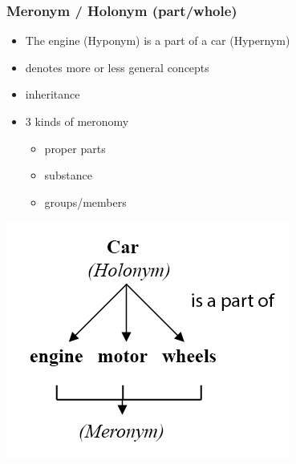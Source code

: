 \begin{frame}
\frametitle{Meronym / Holonym (part/whole)}
\begin{minipage}{0.5\textwidth}
\begin{itemize}
\item The engine (Hyponym) is a part of a car (Hypernym)
\item denotes more or less general concepts
\item inheritance
\item 3 kinds of meronomy
\begin{itemize}
\item proper parts
\item substance
\item groups/members
\end{itemize}
\end{itemize}
\end{minipage}
\begin{minipage}{0.4\textwidth}
\includegraphics[scale=0.33]{img/wordnet_mer.png}
\end{minipage}
\end{frame}

